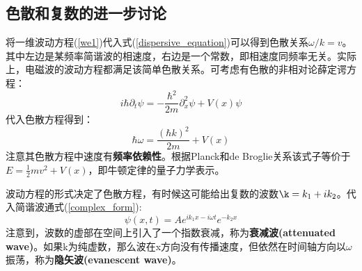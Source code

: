 \documentclass[12pt]{ctexart}%
\begin{document}
\subsection*{色散和复数的进一步讨论}
将一维波动方程(\ref{we1})代入式(\ref{dispersive_equation})可以得到色散关系$\omega/k=v$。其中左边是某频率简谐波的相速度，右边是一个常数，即相速度同频率无关。实际上，电磁波的波动方程都满足该简单色散关系。可考虑有色散的非相对论薛定谔方程：
\begin{equation}
    i\hbar\partial_t\psi=-\frac{\hbar^2}{2m}\partial_x^2\psi+V(x)\psi
\end{equation}
代入色散方程得到：
\begin{equation}
    \hbar\omega=\frac{(\hbar k)^2}{2m}+V(x)
\end{equation}
注意其色散方程中速度有\textbf{频率依赖性}。根据Planck和de Broglie关系该式子等价于$E=\frac{1}{2}mv^2+V(x)$，即牛顿定律的量子力学表示。
\par 波动方程的形式决定了色散方程，有时候这可能给出复数的波数$\k=k_1+ik_2$。代入简谐波通式(\ref{complex_form}):
\begin{equation}
    \psi(x,t)=Ae^{ik_1x-i\omega t}e^{-k_2x}
\end{equation}
注意到，波数的虚部在空间上引入了一个指数衰减，称为\textbf{衰减波(attenuated wave)}。如果k为纯虚数，那么波在x方向没有传播速度，但依然在时间轴方向以$\omega$振荡，称为\textbf{隐矢波(evanescent wave)}。
\end{document}
